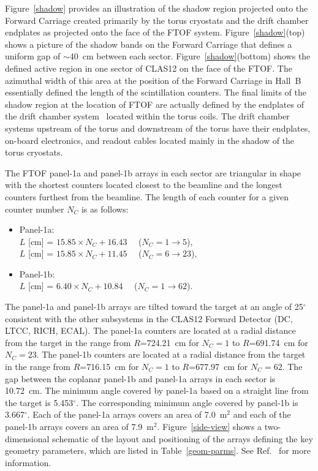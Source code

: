 \documentclass[3p,times,twocolumn]{elsarticle}
\begin{document}
Figure~\ref{shadow} provides an illustration of the shadow region projected onto the Forward Carriage
created primarily by the torus cryostats and the drift chamber endplates as projected onto the face of
the FTOF system. Figure~\ref{shadow}(top) shows a picture of the shadow bands on the Forward
Carriage that defines a uniform gap of $\sim$40~cm between each sector. Figure~\ref{shadow}(bottom)
shows the defined active region in one sector of CLAS12 on the face of the FTOF. The azimuthal width
of this area at the position of the Forward Carriage in Hall~B essentially defined the length of the
scintillation counters. The final limits of the shadow region at the location of FTOF are actually defined
by the endplates of the drift chamber system~\cite{dc-nim} located within the torus coils. The drift chamber
systems upstream of the torus and downstream of the torus have their endplates, on-board electronics, and
readout cables located mainly in the shadow of the torus cryostats.

The FTOF panel-1a and panel-1b arrays in each sector are triangular in shape with the shortest counters
located closest to the beamline and the longest counters furthest from the beamline. The length of each
counter for a given counter number $N_C$ is as follows:

\begin{itemize}
\item Panel-1a: \\
  $L$ [cm] = $15.85 \times N_C + 16.43$ ~~($N_C = 1 \to 5$), \\
  $L$ [cm] = $15.85 \times N_C + 11.45$ ~~($N_C = 6 \to 23$), 
\item Panel-1b: \\
  $L$ [cm] = $6.40 \times N_C + 10.84$ ~~($N_C = 1 \to 62$).
\end{itemize}

The panel-1a and panel-1b arrays are tilted toward the target at an angle of 25$^{\circ}$ consistent with
the other subsystems in the CLAS12 Forward Detector (DC, LTCC, RICH, ECAL). The panel-1a counters
are located at a radial distance from the target in the range from $R$=724.21~cm for $N_C = 1$ to
$R$=691.74~cm for $N_C = 23$. The panel-1b counters are located at a radial distance from the target
in the range from $R$=716.15~cm for $N_C = 1$ to $R$=677.97~cm for $N_C = 62$. The gap between the
coplanar panel-1b and panel-1a arrays in each sector is 10.72~cm. The minimum angle covered by panel-1a
based on a straight line from the target is 5.453$^\circ$. The corresponding minimum angle covered by
panel-1b is 3.667$^\circ$. Each of the panel-1a arrays covers an area of 7.0~m$^2$ and each of the
panel-1b arrays covers an area of 7.9~m$^2$. Figure~\ref{side-view} shows a two-dimensional schematic
of the layout and positioning of the arrays defining the key geometry parameters, which are listed in
Table~\ref{geom-parms}. See Ref.~\cite{ftof-geom} for more information.
\end{document}
